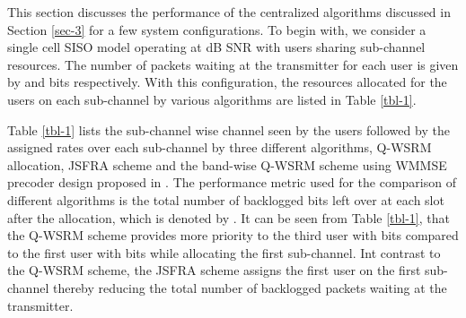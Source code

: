 
This section discusses the performance of the centralized algorithms discussed in Section \ref{sec-3} for a few system configurations. To begin with, we consider a single cell \ac{SISO} model operating at  dB \ac{SNR} with  users sharing  sub-channel resources. The number of packets waiting at the transmitter for each user is given by  and  bits respectively. With this configuration, the resources allocated for the users on each sub-channel by various algorithms are listed in Table \ref{tbl-1}.

Table \ref{tbl-1} lists the sub-channel wise channel seen by the users followed by the assigned rates over each sub-channel by three different algorithms, \ac{Q-WSRM} allocation, \ac{JSFRA} scheme and the band-wise \ac{Q-WSRM} scheme using \ac{WMMSE} precoder design proposed in \cite{wmmse_shi}. The performance metric used for the comparison of different algorithms is the total number of backlogged bits left over at each slot after the allocation, which is denoted by . It can be seen from Table \ref{tbl-1}, that the \ac{Q-WSRM} scheme provides more priority to the third user with  bits compared to the first user with  bits while allocating the first sub-channel. Int contrast to the \ac{Q-WSRM} scheme, the \ac{JSFRA} scheme assigns the first user on the first sub-channel thereby reducing the total number of backlogged packets waiting at the transmitter.
